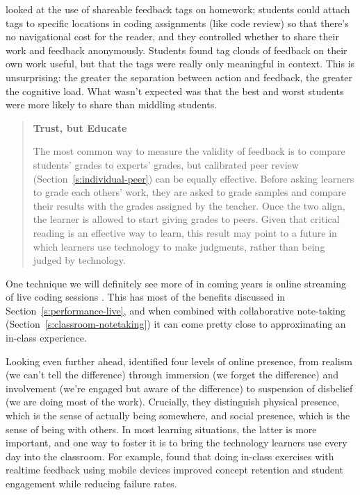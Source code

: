 \cite{Cumm2011} looked at the use of shareable feedback tags on
homework; students could attach tags to specific locations in coding
assignments (like code review) so that there's no navigational cost for
the reader, and they controlled whether to share their work and feedback
anonymously. Students found tag clouds of feedback on their own work
useful, but that the tags were really only meaningful in context. This
is unsurprising: the greater the separation between action and feedback,
the greater the cognitive load. What wasn't expected was that the best
and worst students were more likely to share than middling students.

\begin{quote}\setlength{\parindent}{0pt}
\textbf{Trust, but Educate}

The most common way to measure the validity of feedback is to compare
students' grades to experts' grades, but calibrated peer review
(Section~\ref{s:individual-peer}) can be equally effective. Before
asking learners to grade each others' work, they are asked to grade
samples and compare their results with the grades assigned by the
teacher. Once the two align, the learner is allowed to start giving
grades to peers. Given that critical reading is an effective way to
learn, this result may point to a future in which learners use
technology to make judgments, rather than being judged by technology.
\end{quote}

One technique we will definitely see more of in coming years is online
streaming of live coding sessions \cite{Haar2017}. This has most of
the benefits discussed in Section~\ref{s:performance-live}, and when
combined with collaborative note-taking
(Section~\ref{s:classroom-notetaking}) it can come pretty close to
approximating an in-class experience.

Looking even further ahead, \cite{Ijss2000} identified four levels of
online presence, from realism (we can't tell the difference) through
immersion (we forget the difference) and involvement (we're engaged but
aware of the difference) to suspension of disbelief (we are doing most
of the work). Crucially, they distinguish physical presence, which is
the sense of actually being somewhere, and social presence, which is the
sense of being with others. In most learning situations, the latter is
more important, and one way to foster it is to bring the technology
learners use every day into the classroom. For example,
\cite{Deb2018} found that doing in-class exercises with realtime
feedback using mobile devices improved concept retention and student
engagement while reducing failure rates.

